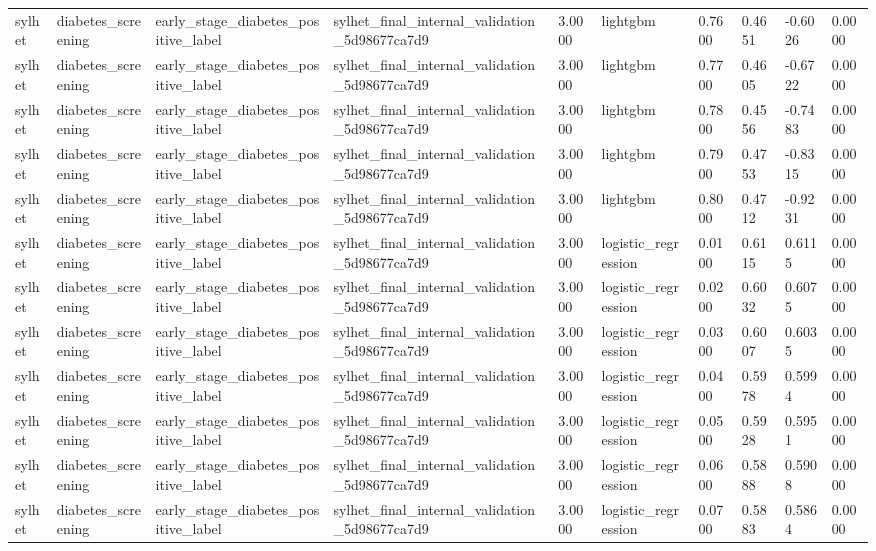 \begin{tabular}{llllllllll}
sylhet & diabetes\_screening & early\_stage\_diabetes\_positive\_label & sylhet\_final\_internal\_validation\_5d98677ca7d9 & 3.0000 & lightgbm & 0.7600 & 0.4651 & -0.6026 & 0.0000 \\
sylhet & diabetes\_screening & early\_stage\_diabetes\_positive\_label & sylhet\_final\_internal\_validation\_5d98677ca7d9 & 3.0000 & lightgbm & 0.7700 & 0.4605 & -0.6722 & 0.0000 \\
sylhet & diabetes\_screening & early\_stage\_diabetes\_positive\_label & sylhet\_final\_internal\_validation\_5d98677ca7d9 & 3.0000 & lightgbm & 0.7800 & 0.4556 & -0.7483 & 0.0000 \\
sylhet & diabetes\_screening & early\_stage\_diabetes\_positive\_label & sylhet\_final\_internal\_validation\_5d98677ca7d9 & 3.0000 & lightgbm & 0.7900 & 0.4753 & -0.8315 & 0.0000 \\
sylhet & diabetes\_screening & early\_stage\_diabetes\_positive\_label & sylhet\_final\_internal\_validation\_5d98677ca7d9 & 3.0000 & lightgbm & 0.8000 & 0.4712 & -0.9231 & 0.0000 \\
sylhet & diabetes\_screening & early\_stage\_diabetes\_positive\_label & sylhet\_final\_internal\_validation\_5d98677ca7d9 & 3.0000 & logistic\_regression & 0.0100 & 0.6115 & 0.6115 & 0.0000 \\
sylhet & diabetes\_screening & early\_stage\_diabetes\_positive\_label & sylhet\_final\_internal\_validation\_5d98677ca7d9 & 3.0000 & logistic\_regression & 0.0200 & 0.6032 & 0.6075 & 0.0000 \\
sylhet & diabetes\_screening & early\_stage\_diabetes\_positive\_label & sylhet\_final\_internal\_validation\_5d98677ca7d9 & 3.0000 & logistic\_regression & 0.0300 & 0.6007 & 0.6035 & 0.0000 \\
sylhet & diabetes\_screening & early\_stage\_diabetes\_positive\_label & sylhet\_final\_internal\_validation\_5d98677ca7d9 & 3.0000 & logistic\_regression & 0.0400 & 0.5978 & 0.5994 & 0.0000 \\
sylhet & diabetes\_screening & early\_stage\_diabetes\_positive\_label & sylhet\_final\_internal\_validation\_5d98677ca7d9 & 3.0000 & logistic\_regression & 0.0500 & 0.5928 & 0.5951 & 0.0000 \\
sylhet & diabetes\_screening & early\_stage\_diabetes\_positive\_label & sylhet\_final\_internal\_validation\_5d98677ca7d9 & 3.0000 & logistic\_regression & 0.0600 & 0.5888 & 0.5908 & 0.0000 \\
sylhet & diabetes\_screening & early\_stage\_diabetes\_positive\_label & sylhet\_final\_internal\_validation\_5d98677ca7d9 & 3.0000 & logistic\_regression & 0.0700 & 0.5883 & 0.5864 & 0.0000 \\

\end{tabular}
